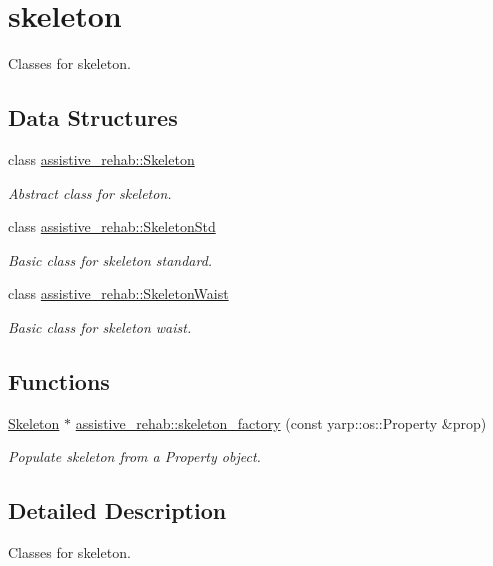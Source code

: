 \section{skeleton}
\label{group__skeleton}


Classes for skeleton.  


\subsection*{Data Structures}
\begin{DoxyCompactItemize}
\item 
class \mbox{\hyperlink{classassistive__rehab_1_1Skeleton}{assistive\+\_\+rehab\+::\+Skeleton}}
\begin{DoxyCompactList}\small\item\em Abstract class for skeleton. \end{DoxyCompactList}\item 
class \mbox{\hyperlink{classassistive__rehab_1_1SkeletonStd}{assistive\+\_\+rehab\+::\+Skeleton\+Std}}
\begin{DoxyCompactList}\small\item\em Basic class for skeleton standard. \end{DoxyCompactList}\item 
class \mbox{\hyperlink{classassistive__rehab_1_1SkeletonWaist}{assistive\+\_\+rehab\+::\+Skeleton\+Waist}}
\begin{DoxyCompactList}\small\item\em Basic class for skeleton waist. \end{DoxyCompactList}\end{DoxyCompactItemize}
\subsection*{Functions}
\begin{DoxyCompactItemize}
\item 
\mbox{\hyperlink{classassistive__rehab_1_1Skeleton}{Skeleton}} $\ast$ \mbox{\hyperlink{group__skeleton_gafe9fe27bb8b50a0843b93dfbb5c571b1}{assistive\+\_\+rehab\+::skeleton\+\_\+factory}} (const yarp\+::os\+::\+Property \&prop)
\begin{DoxyCompactList}\small\item\em Populate skeleton from a Property object. \end{DoxyCompactList}\end{DoxyCompactItemize}


\subsection{Detailed Description}
Classes for skeleton. 


